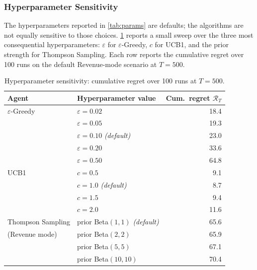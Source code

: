 \subsubsection{Hyperparameter Sensitivity}
The hyperparameters reported in \cref{tab:params} are defaults; the algorithms are not equally sensitive to those choices. \cref{tab:hyper-sens} reports a small sweep over the three most consequential hyperparameters: $\varepsilon$ for $\varepsilon$-Greedy, $c$ for UCB1, and the prior strength for Thompson Sampling. Each row reports the cumulative regret over 100 runs on the default Revenue-mode scenario at $T = 500$.

\begin{table}[H]
\centering
\caption{Hyperparameter sensitivity: cumulative regret over 100 runs at $T=500$.}
\label{tab:hyper-sens}
\small
\renewcommand{\arraystretch}{1.2}
\begin{tabular}{llr}
\toprule
\textbf{Agent} & \textbf{Hyperparameter value} & \textbf{Cum.\ regret $\mathcal{R}_T$}\\
\midrule
$\varepsilon$-Greedy & $\varepsilon = 0.02$            & 18.4\\
                     & $\varepsilon = 0.05$            & 19.3\\
                     & $\varepsilon = 0.10$ \textit{(default)} & 23.0\\
                     & $\varepsilon = 0.20$            & 33.6\\
                     & $\varepsilon = 0.50$            & 64.8\\
\midrule
UCB1                 & $c = 0.5$                       & 9.1\\
                     & $c = 1.0$ \textit{(default)}    & 8.7\\
                     & $c = 1.5$                       & 9.4\\
                     & $c = 2.0$                       & 11.6\\
\midrule
Thompson Sampling    & prior Beta$(1,1)$ \textit{(default)} & 65.6\\
(Revenue mode)       & prior Beta$(2,2)$               & 65.9\\
                     & prior Beta$(5,5)$               & 67.1\\
                     & prior Beta$(10,10)$             & 70.4\\
\bottomrule
\end{tabular}
\end{table}

